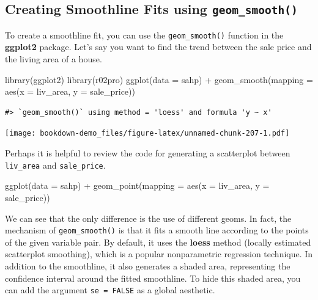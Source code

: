 \documentclass[
]{book}
\newenvironment{Shaded}{\begin{snugshade}}{\end{snugshade}}
\newcommand{\AttributeTok}[1]{\textcolor[rgb]{0.77,0.63,0.00}{#1}}
\newcommand{\FunctionTok}[1]{\textcolor[rgb]{0.00,0.00,0.00}{#1}}
\newcommand{\NormalTok}[1]{#1}
\newcommand{\SpecialCharTok}[1]{\textcolor[rgb]{0.00,0.00,0.00}{#1}}
\begin{document}
\hypertarget{creating-smoothline-fits-using-geom_smooth}{%
\subsection{\texorpdfstring{Creating Smoothline Fits using \texttt{geom\_smooth()}}{Creating Smoothline Fits using geom\_smooth()}}\label{creating-smoothline-fits-using-geom_smooth}}

To create a smoothline fit, you can use the \texttt{geom\_smooth()} function in the \textbf{ggplot2} package. Let's say you want to find the trend between the sale price and the living area of a house.

\begin{Shaded}
\begin{Highlighting}[]
\FunctionTok{library}\NormalTok{(ggplot2)}
\FunctionTok{library}\NormalTok{(r02pro)}
\FunctionTok{ggplot}\NormalTok{(}\AttributeTok{data =}\NormalTok{ sahp) }\SpecialCharTok{+} \FunctionTok{geom\_smooth}\NormalTok{(}\AttributeTok{mapping =} \FunctionTok{aes}\NormalTok{(}\AttributeTok{x =}\NormalTok{ liv\_area, }\AttributeTok{y =}\NormalTok{ sale\_price))}
\end{Highlighting}
\end{Shaded}

\begin{verbatim}
#> `geom_smooth()` using method = 'loess' and formula 'y ~ x'
\end{verbatim}

\texttt{[image: bookdown-demo\_files/figure-latex/unnamed-chunk-207-1.pdf]}

Perhaps it is helpful to review the code for generating a scatterplot between \texttt{liv\_area} and \texttt{sale\_price}.

\begin{Shaded}
\begin{Highlighting}[]
\FunctionTok{ggplot}\NormalTok{(}\AttributeTok{data =}\NormalTok{ sahp) }\SpecialCharTok{+} \FunctionTok{geom\_point}\NormalTok{(}\AttributeTok{mapping =} \FunctionTok{aes}\NormalTok{(}\AttributeTok{x =}\NormalTok{ liv\_area, }\AttributeTok{y =}\NormalTok{ sale\_price))}
\end{Highlighting}
\end{Shaded}

We can see that the only difference is the use of different geoms. In fact, the mechanism of \texttt{geom\_smooth()} is that it fits a smooth line according to the points of the given variable pair. By default, it uses the \textbf{loess} method (locally estimated scatterplot smoothing), which is a popular nonparametric regression technique. In addition to the smoothline, it also generates a shaded area, representing the confidence interval around the fitted smoothline. To hide this shaded area, you can add the argument \texttt{se\ =\ FALSE} as a global aesthetic.
\end{document}
